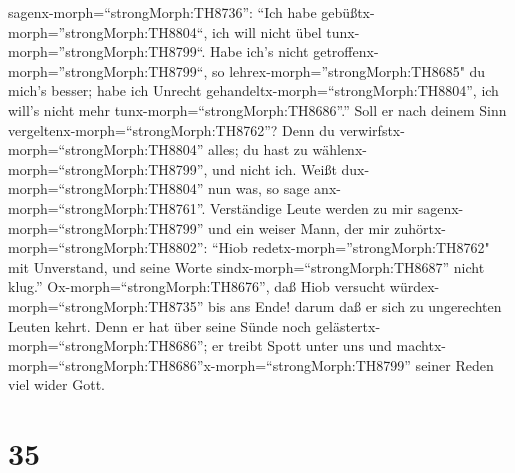 sagenx-morph=``strongMorph:TH8736'': ``Ich habe
gebüßtx-morph=''strongMorph:TH8804``, ich will nicht übel
tunx-morph=''strongMorph:TH8799``.  Habe ich's nicht
getroffenx-morph=''strongMorph:TH8799``, so
lehrex-morph=''strongMorph:TH8685" du mich's besser; habe ich Unrecht
gehandeltx-morph=``strongMorph:TH8804'', ich will's nicht mehr
tunx-morph=``strongMorph:TH8686''.''  Soll er nach deinem
Sinn vergeltenx-morph=``strongMorph:TH8762''? Denn du
verwirfstx-morph=``strongMorph:TH8804'' alles; du hast zu
wählenx-morph=``strongMorph:TH8799'', und nicht ich. Weißt
dux-morph=``strongMorph:TH8804'' nun was, so sage
anx-morph=``strongMorph:TH8761''.  Verständige Leute werden
zu mir sagenx-morph=``strongMorph:TH8799'' und ein weiser Mann, der mir
zuhörtx-morph=``strongMorph:TH8802'':  ``Hiob
redetx-morph=''strongMorph:TH8762" mit Unverstand, und seine Worte
sindx-morph=``strongMorph:TH8687'' nicht klug.'' 
Ox-morph=``strongMorph:TH8676'', daß Hiob versucht
würdex-morph=``strongMorph:TH8735'' bis ans Ende! darum daß er sich zu
ungerechten Leuten kehrt.  Denn er hat über seine Sünde
noch gelästertx-morph=``strongMorph:TH8686''; er treibt Spott unter uns
und machtx-morph=``strongMorph:TH8686''x-morph=``strongMorph:TH8799''
seiner Reden viel wider Gott.

\hypertarget{section-34}{%
\section{35}\label{section-34}}

